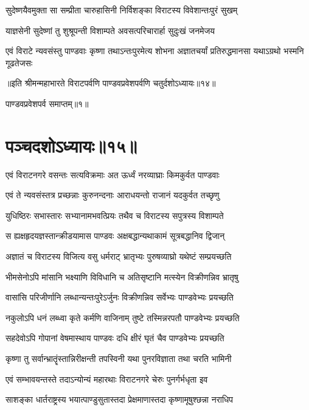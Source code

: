 
\twolineshloka
{सुदेष्णयैवमुक्ता सा सम्प्रीता चारुहासिनी}
{निर्विशङ्का विराटस्य विवेशान्तःपुरं सुखम्}


\twolineshloka
{याज्ञसेनी सुदेष्णां तु शुश्रूपन्ती विशाम्पते}
{अवसत्परिचारार्हा सुदुःखं जनमेजय}


\fourlineindentedshloka
{एवं विराटे न्यवसंस्तु पाण्डवाः}
{कृष्णा तथाऽन्तःपुरमेत्य शोभना}
{अज्ञातचर्यां प्रतिरुद्धमानसा}
{यथाऽग्रथो भस्मनि गूढतेजसः}

॥इति श्रीमन्महाभारते विराटपर्वणि पाण्डवप्रवेशपर्वणि चतुर्दशोऽध्यायः॥१४॥ 

पाण्डवप्रवेशपर्व समाप्तम्॥१॥

\chapter{पञ्चदशोऽध्यायः॥१५॥ }

\twolineshloka
{एवं विराटनगरे वसन्तः सत्यविक्रमाः}
{अत ऊर्ध्वं नरव्याघ्राः किमकुर्वत पाण्डवाः}



\twolineshloka
{एवं ते न्यवसंस्तत्र प्रच्छन्नाः कुरुनन्दनाः}
{आराधयन्तो राजानं यदकुर्वत तच्छृणु}


\twolineshloka
{युधिष्ठिरः सभास्तारः सभ्यानामभवत्प्रियः}
{तथैव च विराटस्य सपुत्रस्य विशाम्पते}


\twolineshloka
{स ह्यक्षहृदयज्ञस्तान्क्रीडयामास पाण्डवः}
{अक्षबद्धान्यथाकामं सूत्रबद्धानिव द्विजान्}


\twolineshloka
{अज्ञातं च विराटस्य विजित्य वसु धर्मराट्}
{भ्रातृभ्यः पुरुषव्याघ्रो यथेष्टं सम्प्रयच्छति}


\twolineshloka
{भीमसेनोऽपि मांसानि भक्ष्याणि विविधानि च}
{अतिसृष्टानि मत्स्येन विक्रीणन्निव भ्रातृषु}


\twolineshloka
{वासांसि परिजीर्णानि लब्धान्यन्तःपुरेऽर्जुनः}
{विक्रीणन्निव सर्वेभ्यः पाण्डवेभ्यः प्रयच्छति}


\twolineshloka
{नकुलोऽपि धनं लब्ध्वा कृते कर्मणि वाजिनाम्}
{तुष्टे तस्मिन्नरपतौ पाण्डवेभ्यः प्रयच्छति}


\twolineshloka
{सहदेवोऽपि गोपानां वेषमास्थाय पाण्डवः}
{दधि क्षीरं घृतं चैव पाण्डवेभ्यः प्रयच्छति}


\twolineshloka
{कृष्णा तु सर्वान्भ्रातॄंस्तान्निरीक्षन्ती तपस्विनी}
{यथा पुनरविज्ञाता तथा चरति भामिनी}


\twolineshloka
{एवं सम्भावयन्तस्ते तदाऽन्योन्यं महारथाः}
{विराटनगरे चेरुः पुनर्गर्भधृता इव}


\twolineshloka
{साशङ्का धार्तराष्ट्रस्य भयात्पाण्डुसुतास्तदा}
{प्रेक्षमाणास्तदा कृष्णामूषुश्छन्ना नराधिप}


